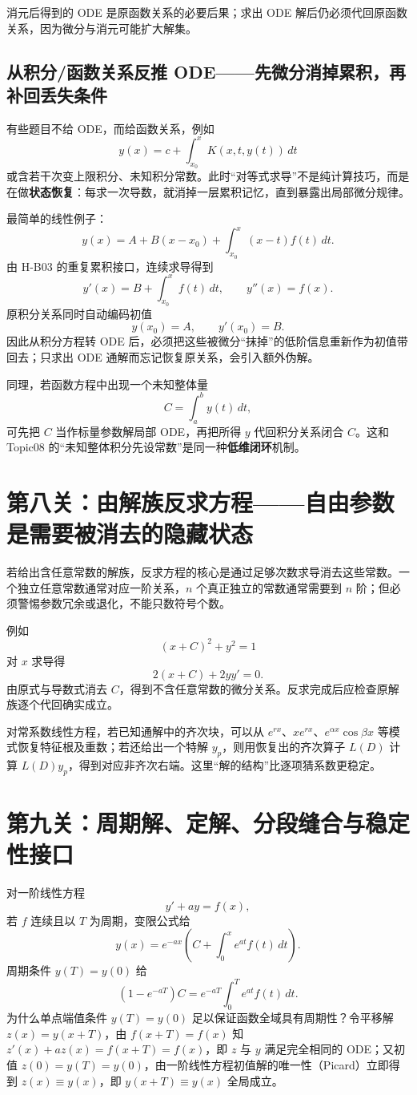 \documentclass[11pt,a4paper,fontset=fandol]{ctexart}
\begin{document}
消元后得到的 ODE 是原函数关系的必要后果；求出 ODE 解后仍必须代回原函数关系，因为微分与消元可能扩大解集。

\subsection{从积分/函数关系反推 ODE——先微分消掉累积，再补回丢失条件}

有些题目不给 ODE，而给函数关系，例如
\[
y(x)=c+\int_{x_0}^{x}K(x,t,y(t))\,dt
\]
或含若干次变上限积分、未知积分常数。此时“对等式求导”不是纯计算技巧，而是在做\textbf{状态恢复}：每求一次导数，就消掉一层累积记忆，直到暴露出局部微分规律。

最简单的线性例子：
\[
y(x)=A+B(x-x_0)+\int_{x_0}^{x}(x-t)f(t)\,dt.
\]
由 H-B03 的重复累积接口，连续求导得到
\[
y'(x)=B+\int_{x_0}^{x}f(t)\,dt,
\qquad
y''(x)=f(x).
\]
原积分关系同时自动编码初值
\[
y(x_0)=A,\qquad y'(x_0)=B.
\]
因此从积分方程转 ODE 后，必须把这些被微分“抹掉”的低阶信息重新作为初值带回去；只求出 ODE 通解而忘记恢复原关系，会引入额外伪解。

同理，若函数方程中出现一个未知整体量
\[
C=\int_a^b y(t)\,dt,
\]
可先把 $C$ 当作标量参数解局部 ODE，再把所得 $y$ 代回积分关系闭合 $C$。这和 Topic08 的“未知整体积分先设常数”是同一种\textbf{低维闭环}机制。

\section{第八关：由解族反求方程——自由参数是需要被消去的隐藏状态}

若给出含任意常数的解族，反求方程的核心是通过足够次数求导消去这些常数。一个独立任意常数通常对应一阶关系，$n$ 个真正独立的常数通常需要到 $n$ 阶；但必须警惕参数冗余或退化，不能只数符号个数。

例如
\[
(x+C)^2+y^2=1
\]
对 $x$ 求导得
\[
2(x+C)+2yy'=0.
\]
由原式与导数式消去 $C$，得到不含任意常数的微分关系。反求完成后应检查原解族逐个代回确实成立。

对常系数线性方程，若已知通解中的齐次块，可以从 $e^{rx}$、$xe^{rx}$、$e^{\alpha x}\cos\beta x$ 等模式恢复特征根及重数；若还给出一个特解 $y_p$，则用恢复出的齐次算子 $L(D)$ 计算 $L(D)y_p$，得到对应非齐次右端。这里“解的结构”比逐项猜系数更稳定。

\section{第九关：周期解、定解、分段缝合与稳定性接口}

对一阶线性方程
\[
y'+ay=f(x),
\]
若 $f$ 连续且以 $T$ 为周期，变限公式给
\[
y(x)=e^{-ax}\left(C+\int_0^x e^{at}f(t)\,dt\right).
\]
周期条件 $y(T)=y(0)$ 给
\[
(1-e^{-aT})C=e^{-aT}\int_0^T e^{at}f(t)\,dt.
\]
为什么单点端值条件 $y(T)=y(0)$ 足以保证函数全域具有周期性？令平移解 $z(x)=y(x+T)$，由 $f(x+T)=f(x)$ 知 $z'(x)+az(x)=f(x+T)=f(x)$，即 $z$ 与 $y$ 满足完全相同的 ODE；又初值 $z(0)=y(T)=y(0)$，由一阶线性方程初值解的唯一性（Picard）立即得到 $z(x)\equiv y(x)$，即 $y(x+T)\equiv y(x)$ 全局成立。
\end{document}
